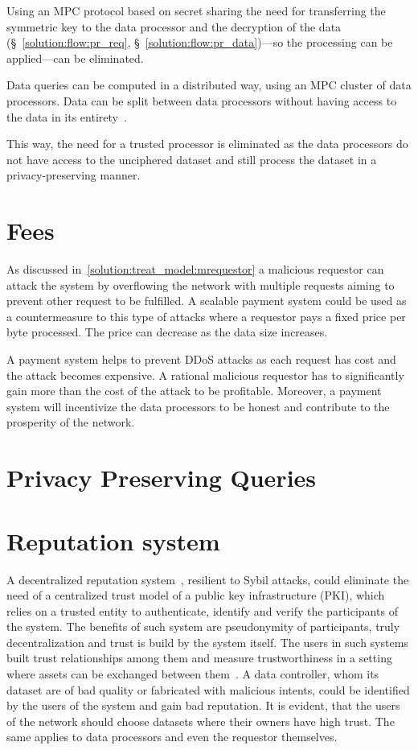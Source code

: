 Using an MPC protocol based on secret sharing the need for transferring the symmetric key to the data processor and the decryption of the data (§~\ref{solution:flow:pr_req}, §~\ref{solution:flow:pr_data})---so the processing can be applied---can be eliminated.

Data queries can be computed in a distributed way, using an MPC cluster of data processors. Data can be split between data processors without having access to the data in its entirety~\cite{DBLP:journals/corr/ZyskindNP15}.

This way, the need for a trusted processor is eliminated as the data processors do not have access to the unciphered dataset and still process the dataset in a privacy-preserving manner.

\section{Fees}
\label{future_work:fees}

As discussed in~\ref{solution:treat_model:mrequestor} a malicious requestor can attack the system by overflowing the network with multiple requests aiming to prevent other request to be fulfilled. A scalable payment system could be used as a countermeasure to this type of attacks where a requestor pays a fixed price per byte processed. The price can decrease as the data size increases.

A payment system helps to prevent DDoS attacks as each request has cost and the attack becomes expensive. A rational malicious requestor has to significantly gain more than the cost of the attack to be profitable. Moreover, a payment system will incentivize the data processors to be honest and contribute to the prosperity of the network.

\section{Privacy Preserving Queries}
\label{future_work:ppq}

\section{Reputation system}
\label{future_work:ranking_system}

A decentralized reputation system~\cite{trust_is_risk}, resilient to Sybil attacks, could eliminate the need of a centralized trust model of a public key infrastructure (PKI), which relies on a trusted entity to authenticate, identify and verify the participants of the system. The benefits of such system are pseudonymity of participants, truly decentralization and trust is build by the system itself. The users in such systems built trust relationships among them and measure trustworthiness in a setting where assets can be exchanged between them~\cite{trust_is_risk}. A data controller, whom its dataset are of bad quality or fabricated with malicious intents, could be identified by the users of the system and gain bad reputation. It is evident, that the users of the network should choose datasets where their owners have high trust. The same applies to data processors and even the requestor themselves.

